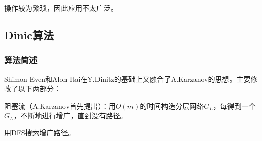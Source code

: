 操作较为繁琐，因此应用不太广泛。
\subsection{Dinic算法}
\subsubsection{算法简述}
Shimon Even和Alon Itai在Y.Dinitz的基础上又融合了A.Karzanov的思想。主要修改了以下两部分：

\begin{itemize}
  \begin{small}
  \item 阻塞流（A.Karzanov首先提出）：用$O(m)$的时间构造分层网络$G_L$，每得到一个$G_L$，不断地进行增广，直到没有路径。

  \item 用DFS搜索增广路径。
\end{small}
\end{itemize}
